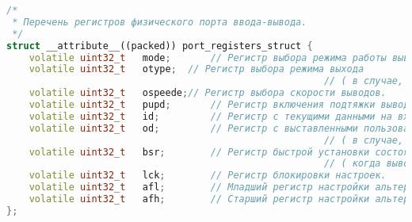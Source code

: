 \begin{lstlisting}[language=C++, frame=tlBR, basicstyle=\fontsize{10}{10}\ttfamily]
/*
 * Перечень регистров физического порта ввода-вывода.
 */
struct __attribute__((packed)) port_registers_struct {
	volatile uint32_t	mode;		// Регистр выбора режима работы выводов.
	volatile uint32_t	otype;	// Регистр выбора режима выхода 
														// ( в случае, если вывод настроен как выход ).
	volatile uint32_t	ospeede;// Регистр выбора скорости выводов.
	volatile uint32_t	pupd;		// Регистр включения подтяжки выводов.
	volatile uint32_t	id;			// Регистр с текущими данными на входе вывода.
	volatile uint32_t	od;			// Регистр с выставленными пользователем на выход данными
														// ( в случае, если вывод настроен как выход ).
	volatile uint32_t	bsr;		// Регистр быстрой установки состояния выводов
														// ( когда вывод настроен как выход ).
	volatile uint32_t	lck;		// Регистр блокировки настроек.
	volatile uint32_t	afl;		// Младший регистр настройки альтернативных функций выводов.
	volatile uint32_t	afh;		// Старший регистр настройки альтернативных функций выводов.
};\end{lstlisting}